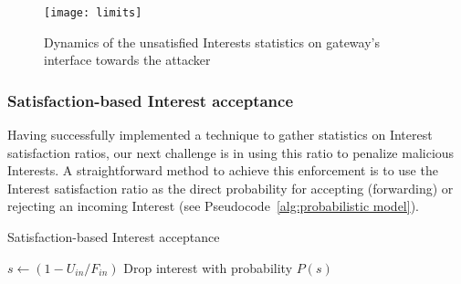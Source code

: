 \begin{figure}[htbp]
  \centering
  \texttt{[image: limits]}
  \vspace{-0.3cm}
  \caption{Dynamics of the unsatisfied Interests statistics on gateway's interface towards the attacker}
  \label{fig:ratio example}
\end{figure}


\subsubsection{\textbf{Satisfaction-based Interest acceptance}}
\label{sec:probabilistic}

Having successfully implemented a technique to gather statistics on Interest satisfaction ratios, our next challenge is in using this ratio to penalize malicious Interests. A straightforward method to achieve this enforcement is to use the Interest satisfaction ratio as the direct probability for accepting (forwarding) or rejecting an incoming Interest (see Pseudocode~\ref{alg:probabilistic model}).




\begin{algorithm}[h]
\footnotesize
\caption{\small Satisfaction-based Interest acceptance}
\label{alg:probabilistic model}
\begin{algorithmic}[1]
\State{} 

\vspace{0.1cm}

    \State{} 
    \State{} 
    
     
        \State $s \leftarrow (1 - U_{in} / F_{in})$
        \State Drop interest with probability $P(s)$
    \EndIf

\EndFunction

\end{algorithmic}
\end{algorithm}

